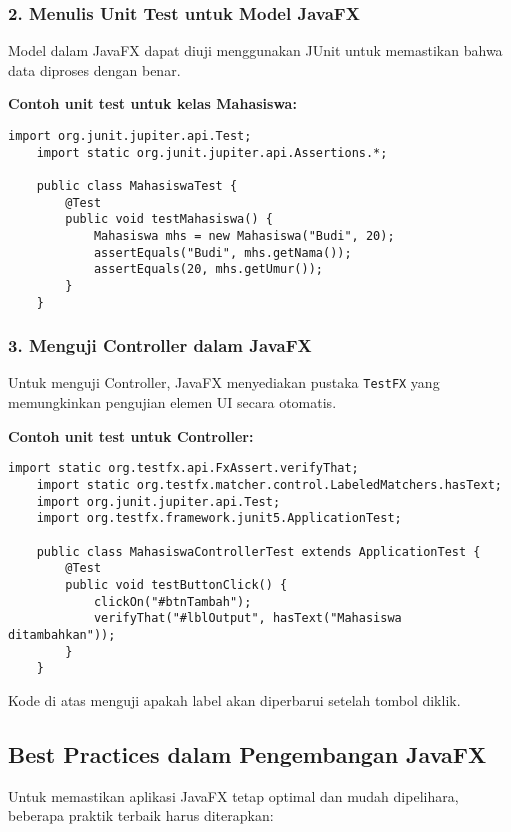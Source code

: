 \subsubsection{2. Menulis Unit Test untuk Model JavaFX}

Model dalam JavaFX dapat diuji menggunakan JUnit untuk memastikan bahwa data diproses dengan benar.

\textbf{Contoh unit test untuk kelas Mahasiswa:}
\begin{lstlisting}[style=JavaStyle, caption=Unit test untuk Model Mahasiswa]
	import org.junit.jupiter.api.Test;
	import static org.junit.jupiter.api.Assertions.*;
	
	public class MahasiswaTest {
		@Test
		public void testMahasiswa() {
			Mahasiswa mhs = new Mahasiswa("Budi", 20);
			assertEquals("Budi", mhs.getNama());
			assertEquals(20, mhs.getUmur());
		}
	}
\end{lstlisting}

\subsubsection{3. Menguji Controller dalam JavaFX}

Untuk menguji Controller, JavaFX menyediakan pustaka \texttt{TestFX} yang memungkinkan pengujian elemen UI secara otomatis.

\textbf{Contoh unit test untuk Controller:}
\begin{lstlisting}[style=JavaStyle, caption=Unit test untuk Controller JavaFX]
	import static org.testfx.api.FxAssert.verifyThat;
	import static org.testfx.matcher.control.LabeledMatchers.hasText;
	import org.junit.jupiter.api.Test;
	import org.testfx.framework.junit5.ApplicationTest;
	
	public class MahasiswaControllerTest extends ApplicationTest {
		@Test
		public void testButtonClick() {
			clickOn("#btnTambah");
			verifyThat("#lblOutput", hasText("Mahasiswa ditambahkan"));
		}
	}
\end{lstlisting}

Kode di atas menguji apakah label akan diperbarui setelah tombol diklik.

\subsection{Best Practices dalam Pengembangan JavaFX}

Untuk memastikan aplikasi JavaFX tetap optimal dan mudah dipelihara, beberapa praktik terbaik harus diterapkan:

